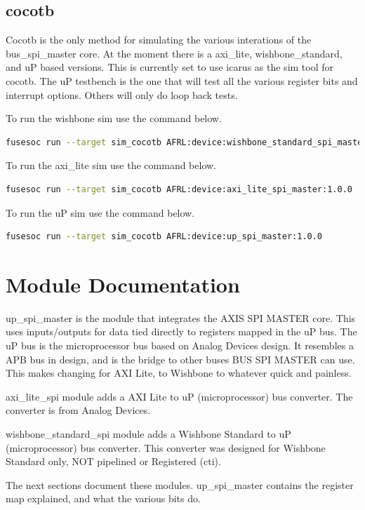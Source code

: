 \subsection{cocotb}
\par
Cocotb is the only method for simulating the various interations of the bus\_spi\_master core. At the moment there is a
axi\_lite, wishbone\_standard, and uP based versions. This is currently set to use icarus as the sim tool for cocotb. The uP
testbench is the one that will test all the various register bits and interrupt options. Others will only do loop back tests.

\par
To run the wishbone sim use the command below.
\begin{lstlisting}[language=bash]
fusesoc run --target sim_cocotb AFRL:device:wishbone_standard_spi_master:1.0.0
\end{lstlisting}

\par
To run the axi\_lite sim use the command below.
\begin{lstlisting}[language=bash]
fusesoc run --target sim_cocotb AFRL:device:axi_lite_spi_master:1.0.0
\end{lstlisting}

\par
To run the uP sim use the command below.
\begin{lstlisting}[language=bash]
fusesoc run --target sim_cocotb AFRL:device:up_spi_master:1.0.0
\end{lstlisting}


\newpage

\section{Module Documentation} \label{Module Documentation}

\par
up\_spi\_master is the module that integrates the AXIS SPI MASTER core.
This uses inputs/outputs for data tied directly to registers mapped in the uP bus.
The uP bus is the microprocessor bus based on Analog Devices design. It resembles a APB bus in design,
and is the bridge to other buses BUS SPI MASTER can use. This makes changing for AXI Lite, to Wishbone to whatever
quick and painless.

\par
axi\_lite\_spi module adds a AXI Lite to uP (microprocessor) bus converter. The converter is
from Analog Devices.

\par
wishbone\_standard\_spi module adds a Wishbone Standard to uP (microprocessor) bus converter. This
converter was designed for Wishbone Standard only, NOT pipelined or Registered (cti).

\vspace{15mm}
\par
The next sections document these modules. up\_spi\_master contains the register map explained, and what the various bits do.

